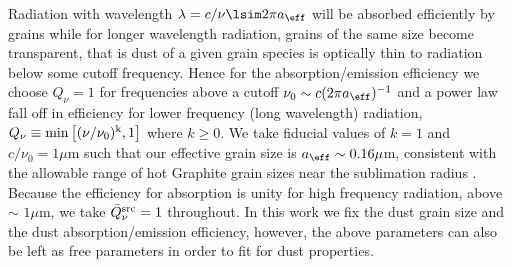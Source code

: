 Radiation with wavelength $\lambda = c/\nu \lsim 2 \pi a_{\eff}$ will be
absorbed efficiently by grains while for longer wavelength radiation, grains
of the same size become transparent, that is dust of a given grain species is
optically thin to radiation below some cutoff frequency. Hence for the
absorption/emission efficiency we choose $Q_{\nu}=1$ for frequencies above a
cutoff $\nu_0 \sim c (2 \pi a_{\eff})^{-1}$ and a power law fall off in
efficiency for lower frequency (long wavelength) radiation, $Q_{\nu} \equiv
\rm{min}\left[ (\nu/\nu_0)^k, 1\right]$ where $k \geq 0$. We take fiducial
values of $k=1$ and $c/\nu_0 = 1\mu$m such that our effective grain size is
$a_{\eff} \sim 0.16 \mu$m,  consistent with the allowable range of hot
Graphite grain sizes near the sublimation radius \citep{LaorDraine:1993,
MorNetzer:2012}. Because the efficiency for absorption is unity for high
frequency radiation, above $\sim$ $1\mu$m, we take $\bar{Q}^{\rm src}_{\nu} =
1$ throughout. In this work we fix the dust grain size and the dust
absorption/emission efficiency, however, the above parameters can also be left
as free parameters in order to fit for dust properties.


